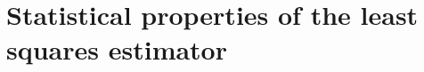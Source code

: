 \documentclass{article}
\begin{document}







\section{Statistical properties of the least squares estimator}\label{sec:stat-prop-least}
\end{document}
